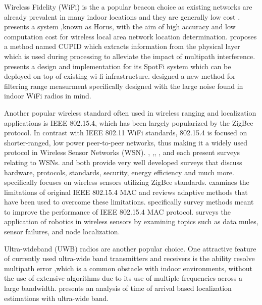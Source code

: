 \documentclass[conference]{IEEEtran}
\begin{document}
			Wireless Fidelity (WiFi)  is the a popular beacon choice as existing networks are already prevalent in many indoor locations and they are generally low cost \cite{Youssef2005} \cite{Sen2013} \cite{Kotaru2015} \cite{Rea2017}. \cite{Youssef2005} presents a system ,known as Horus, with the aim of high accuracy and low computation cost for wireless local area network location determination. \cite{Sen2013} proposes a method named CUPID which extracts information from the physical layer which is used during processing to alleviate the impact of multipath interference. \cite{Kotaru2015} presents a design and implementation for its SpotFi system which can be deployed on top of existing wi-fi infrastructure. \cite{Rea2017} designed a new method for filtering range measurment specifically designed with the large noise found in indoor WiFi radios in mind. 

			 Another popular wireless standard often used in wireless ranging and localization applications is IEEE 802.15.4, which has been largely popularized by the ZigBee protocol. In contrast with IEEE 802.11 WiFi standards, 802.15.4 is focused on shorter-ranged, low power peer-to-peer networks, thus making it a widely used protocol in Wireless Sensor Networks (WSN).  \cite{Baronti2007}, \cite{Khanafer2014},\cite{Shue2013}, \cite{Akyildiz2002}, and \cite{Xia2011} each present surveys relating to WSNs. \cite{Baronti2007} and \cite{Akyildiz2002} both provide very well developed surveys that discuss hardware, protocols, standards, security, energy efficiency and much more. \cite{Baronti2007} specifically focuses on wireless sensors utilizing ZigBee standards. \cite{Xia2011} examines the limitations of original IEEE 802.15.4 MAC and reviews adaptive methods that have been used to overcome these limitations. \cite{Khanafer2014} specifically survey methods meant to improve the performance of IEEE 802.15.4 MAC protocol. \cite{Shue2013} surveys the application of robotics in wireless sensors by examining topics such as data mules, sensor failures, and node localization. 
			 
			 Ultra-wideband (UWB) radios are another popular choice. One attractive feature of currently used ultra-wide band transmitters and receivers is the ability resolve multipath error ,which is a common obstacle with indoor environments, without the use of extensive algorithms due to its use of multiple frequencies across a large bandwidth. \cite{Gezici2005} presents an analysis of time of arrival based localization estimations with ultra-wide band. 
\end{document}
